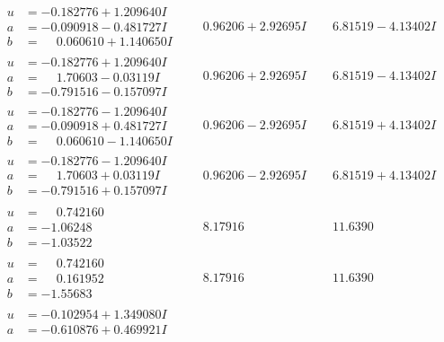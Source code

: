 \documentclass[1p]{elsarticle_modified}
\theoremstyle{definition}
\begin{document}
$$\begin{array}{c|c|c}
\begin{aligned}
u &= -0.182776 + 1.209640 I \\
a &= -0.090918 - 0.481727 I \\
b &= \phantom{-}0.060610 + 1.140650 I\end{aligned}
 & \phantom{-}0.96206 + 2.92695 I & \phantom{-}6.81519 - 4.13402 I \\ \hline\begin{aligned}
u &= -0.182776 + 1.209640 I \\
a &= \phantom{-}1.70603 - 0.03119 I \\
b &= -0.791516 - 0.157097 I\end{aligned}
 & \phantom{-}0.96206 + 2.92695 I & \phantom{-}6.81519 - 4.13402 I \\ \hline\begin{aligned}
u &= -0.182776 - 1.209640 I \\
a &= -0.090918 + 0.481727 I \\
b &= \phantom{-}0.060610 - 1.140650 I\end{aligned}
 & \phantom{-}0.96206 - 2.92695 I & \phantom{-}6.81519 + 4.13402 I \\ \hline\begin{aligned}
u &= -0.182776 - 1.209640 I \\
a &= \phantom{-}1.70603 + 0.03119 I \\
b &= -0.791516 + 0.157097 I\end{aligned}
 & \phantom{-}0.96206 - 2.92695 I & \phantom{-}6.81519 + 4.13402 I \\ \hline\begin{aligned}
u &= \phantom{-}0.742160\phantom{ +0.000000I} \\
a &= -1.06248\phantom{ +0.000000I} \\
b &= -1.03522\phantom{ +0.000000I}\end{aligned}
 & \phantom{-}8.17916\phantom{ +0.000000I} & \phantom{-}11.6390\phantom{ +0.000000I} \\ \hline\begin{aligned}
u &= \phantom{-}0.742160\phantom{ +0.000000I} \\
a &= \phantom{-}0.161952\phantom{ +0.000000I} \\
b &= -1.55683\phantom{ +0.000000I}\end{aligned}
 & \phantom{-}8.17916\phantom{ +0.000000I} & \phantom{-}11.6390\phantom{ +0.000000I} \\ \hline\begin{aligned}
u &= -0.102954 + 1.349080 I \\
a &= -0.610876 + 0.469921 I \\

\end{aligned}
\end{array}$$
\end{document}
